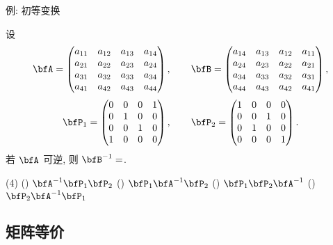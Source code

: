 \begin{frame}{例: 初等变换}
	\onslide<+->
	\begin{exercise}
		设\[\bfA=\begin{pmatrix}
			a_{11}&a_{12}&a_{13}&a_{14}\\
			a_{21}&a_{22}&a_{23}&a_{24}\\
			a_{31}&a_{32}&a_{33}&a_{34}\\
			a_{41}&a_{42}&a_{43}&a_{44}
		\end{pmatrix},\qquad\bfB=\begin{pmatrix}
			a_{14}&a_{13}&a_{12}&a_{11}\\
			a_{24}&a_{23}&a_{22}&a_{21}\\
			a_{34}&a_{33}&a_{32}&a_{31}\\
			a_{44}&a_{43}&a_{42}&a_{41}
		\end{pmatrix},\]\[\bfP_1=\begin{pmatrix}
			0&0&0&1\\
			0&1&0&0\\
			0&0&1&0\\
			1&0&0&0
		\end{pmatrix},\qquad\bfP_2=\begin{pmatrix}
			1&0&0&0\\
			0&0&1&0\\
			0&1&0&0\\
			0&0&0&1
		\end{pmatrix}.\]
		若 $\bfA$ 可逆, 则 $\bfB^{-1}=$.
		\begin{taskschoice}(4)
			() $\bfA^{-1}\bfP_1\bfP_2$
			() $\bfP_1\bfA^{-1}\bfP_2$
			() $\bfP_1\bfP_2\bfA^{-1}$
			() $\bfP_2\bfA^{-1}\bfP_1$
		\end{taskschoice}
	\end{exercise}
\end{frame}


\subsection{矩阵等价}

